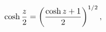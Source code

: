 \[\mathop{\cosh\/}\nolimits\frac{z}{2}=\left(\frac{\mathop{\cosh\/}\nolimits z+1%
}{2}\right)^{1/2},\]